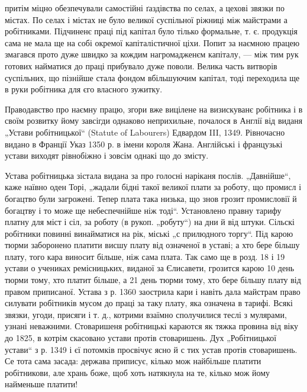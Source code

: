 \parcont{}
притім міцно обезпечували самостійні ґаздівства по селах,
а цехові звязки по містах. По селах і містах не було великої
суспільної ріжниці між майстрами а робітниками.
Підчиненє праці під капітал було тілько формальне, т. є.
продукція сама не мала ще на собі окремої капіталістичної
ціхи. Попит за наємною працею змагався прото дуже швидко
за кождим нагромадженєм капіталу, — між тим рук готових
найматися до праці прибувало дуже поволи. Велика
часть витворів суспільних, що пізнійше стала фондом вбільшуючим
капітал, тоді переходила ще в руки робітника для
єго власного зужитку.

Праводавство про наємну працю, згори вже вицілене
на визискуванє робітника і в своїм розвитку йому завсігди
однаково неприхильне, почалося в Англії від виданя „Устави
робітницької“ (Statute of Labourers) Едвардом III, 1349.
Рівночасно видано в Франції Указ 1350 р. в імени короля
Жана. Англійські і французькі устави виходят рівнобіжно
і зовсім однакі що до змісту.

Устава робітницька зістала видана за про голосні наріканя
послів. „Давнійше“, каже наївно оден Торі, „жадали
бідні такої великої плати за роботу, що промисл і богацтво
були загрожені. Тепер плата така низька, що знов грозит
промисловії й богацтву і то може ще небеспечнійше ніж
тоді“. Установлено правну тарифу платну для міст і сіл,
за роботу (в рукоп. „робуту“) на дни й від штуки. Сільскі робітники
повинні винайматися на рік, міські „с прилюдного
торгу“. Під карою тюрми заборонено платити висшу плату
від означеної в уставі; а хто бере більшу плату, того кара
виносит більше, ніж сама плата. Так само ще в розд. 18
і 19 устави о учениках ремісницьких, виданої за Єлисавети,
грозится карою 10 день тюрми тому, хто платит більше,
а 21 день тюрми тому, хто бере більшу плату від правом
приписаної. Устава з р. 1360 заострила кари і навіть дала
майстрам право силувати робітників мусом до праці за таку
плату, яка означена в тарифі. Всякі звязки, угоди, присяги
і т. д., котрими взаїмно сполучилися теслі з мулярами,
узнані неважними. Стоваришеня робітницькі караются як
тяжка провина від  віку до 1825, в котрім скасовано
устави протів стоваришень. Дух „Робітницької устави“ з р.
1349 і єї потомків просвічує ясно й с тих устав протів стоваришень.
Се тота сама засада: держава приписує, кілько
мож найбільше платити робітникови, але хрань боже, щоб
хоть натякнула на те, кілько мож йому найменьше платити!

